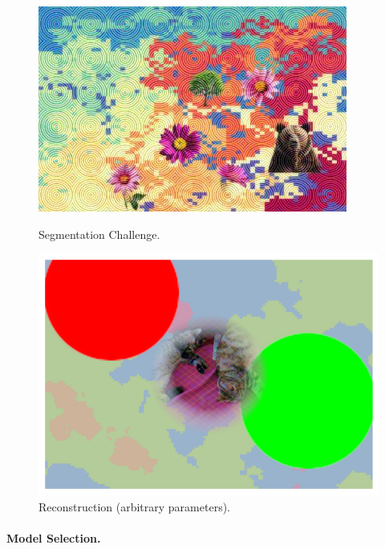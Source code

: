 \documentclass[a4paper, oneside]{discothesis}
\begin{document}
\begin{figure}[th]
	\centering
	\begin{minipage}[t]{0.49\textwidth}\centering\includegraphics[width=\textwidth]{figures/hcaptcha-seg.png}\caption{Segmentation Challenge.}\label{fig:segchallenge}\end{minipage}
	\hfill
	\begin{minipage}[t]{0.49\textwidth}\centering\includegraphics[width=\textwidth]{figures/hcaptcha-seg-baiba.png}\caption{Reconstruction (arbitrary parameters).}\label{fig:segreconstruction}\end{minipage}
\end{figure}

\paragraph{Model Selection.}
\end{document}
